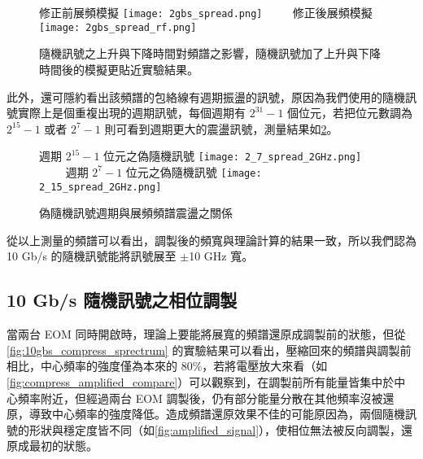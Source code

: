\documentclass[class=NCU_thesis, crop=false]{standalone}
\begin{document}
\begin{figure}[!hbt]
    \centering
    \subcaptionbox
        {修正前展頻模擬
        \label{fig:subfig_fig1}}
        {\texttt{[image: 2gbs\_spread.png]}}
    ~~~~
    \subcaptionbox
        {修正後展頻模擬
        \label{fig:subfig_fig2}}
        {\texttt{[image: 2gbs\_spread\_rf.png]}}
    \caption[隨機訊號之上升與下降時間對頻譜之影響]{隨機訊號之上升與下降時間對頻譜之影響，隨機訊號加了上升與下降時間後的模擬更貼近實驗結果。}
    \label{fig:simulation_rising_falling}
\end{figure}

此外，還可隱約看出該頻譜的包絡線有週期振盪的訊號，原因為我們使用的隨機訊號實際上是個重複出現的週期訊號，每個週期有 $2^{31}-1$ 個位元，若把位元數調為 $2^{15}-1$ 或者 $2^{7}-1$ 則可看到週期更大的震盪訊號，測量結果如\cref{fig:different_length_PRBS}。

\begin{figure}[!hbt]
    \centering
    \subcaptionbox
        {週期 $2^{15}-1$ 位元之偽隨機訊號
        \label{fig:subfig_fig1}}
        {\texttt{[image: 2\_7\_spread\_2GHz.png]}}
    ~~~~
    \subcaptionbox
        {週期 $2^{7}-1$ 位元之偽隨機訊號
        \label{fig:subfig_fig2}}
        {\texttt{[image: 2\_15\_spread\_2GHz.png]}}
    \caption{偽隨機訊號週期與展頻頻譜震盪之關係}
    \label{fig:different_length_PRBS}
\end{figure}

從以上測量的頻譜可以看出，調製後的頻寬與理論計算的結果一致，所以我們認為 10 Gb/s 的隨機訊號能將訊號展至 $\pm$10 GHz 寬。

\subsection{10 Gb/s 隨機訊號之相位調製}

當兩台 EOM 同時開啟時，理論上要能將展寬的頻譜還原成調製前的狀態，但從\cref{fig:10gbs_compress_sprectrum} 的實驗結果可以看出，壓縮回來的頻譜與調製前相比，中心頻率的強度僅為本來的 80\%，若將電壓放大來看（如\cref{fig:compress_amplified_compare}）可以觀察到，在調製前所有能量皆集中於中心頻率附近，但經過兩台 EOM 調製後，仍有部分能量分散在其他頻率沒被還原，導致中心頻率的強度降低。造成頻譜還原效果不佳的可能原因為，兩個隨機訊號的形狀與穩定度皆不同（如\cref{fig:amplified_signal}），使相位無法被反向調製，還原成最初的狀態。
\end{document}
